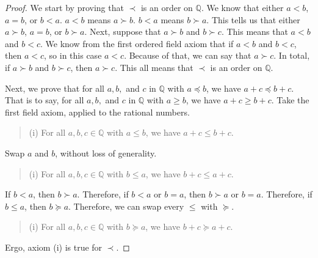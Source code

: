\documentclass[11pt]{article}
\begin{document}
\begin{proof}
        We start by proving that $\prec$ is an order on $\mathbb{Q}$.
        We know that either $a < b$, $a = b$, or $b < a$.
        $a < b$ means $a \succ b$. 
        $b < a$ means $b \succ a$.
        This tells us that either $a \succ b$, $a = b$, or $b \succ a$.
        Next, suppose that $a \succ b$ and $b \succ c$.
        This means that $a < b$ and $b < c$. 
        We know from the first ordered field axiom that if $a < b$ and $b < c$, then $a < c$, so in this case $a < c$.
        Because of that, we can say that $a \succ c$.
        In total, if $a \succ b$ and $b \succ c$, then $a \succ c$.
        This all means that $\prec$ is an order on $\mathbb{Q}$.

        Next, we prove that for all $a, b,$ and $c$ in $\mathbb{Q}$ with $a \preceq b$, we have $a + c \preceq b + c$.
        That is to say, for all $a, b,$ and $c$ in $\mathbb{Q}$ with $a \geq b$, we have $a + c \geq b + c$.
        Take the first field axiom, applied to the rational numbers.
        \begin{quote}
            (i) For all $a, b, c \in \mathbb{Q}$ with $a \leq b$, we have $a + c \leq b + c$.
        \end{quote}
        Swap $a$ and $b$, without loss of generality.
        \begin{quote}
            (i) For all $a, b, c \in \mathbb{Q}$ with $b \leq a$, we have $b + c \leq a + c$.
        \end{quote}
        If $b < a$, then $b \succ a$.
        Therefore, if $b < a$ or $b = a$, then $b \succ a$ or $b = a$.
        Therefore, if $b \leq a$, then $b \succeq a$.
        Therefore, we can swap every $\leq$ with $\succeq$.
        \begin{quote}
            (i) For all $a, b, c \in \mathbb{Q}$ with $b \succeq a$, we have $b + c \succeq a + c$.
        \end{quote}
        Ergo, axiom (i) is true for $\prec$.


\end{proof}
\end{document}
